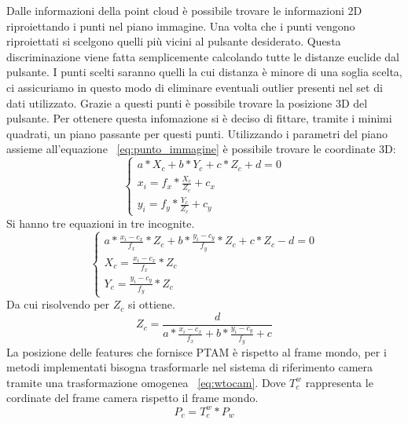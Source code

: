 Dalle informazioni della point cloud è possibile trovare le informazioni 2D riproiettando i punti nel piano immagine. Una volta che i punti vengono riproiettati si scelgono quelli più vicini al pulsante desiderato. Questa discriminazione viene fatta semplicemente calcolando tutte le distanze euclide dal pulsante. I punti scelti saranno quelli la cui distanza è minore di una soglia scelta, ci assicuriamo in questo modo di eliminare eventuali outlier presenti nel set di dati utilizzato. Grazie a questi punti è possibile trovare la posizione 3D del pulsante. Per ottenere questa infomazione si è deciso di fittare, tramite i minimi quadrati, un piano passante per questi punti. Utilizzando i parametri del piano assieme all'equazione ~\ref{eq:punto_immagine} è possibile trovare le coordinate 3D:
\begin{equation}
\begin{cases}
	a*X_c + b*Y_c + c*Z_c+ d = 0    \\
  	x_i = f_x * \frac{X_c}{Z_c}	+ c_x\\	
	y_i = f_y* \frac{Y_c}{Z_c} + c_y
 \end{cases}
 \label{sistema di equazione}
\end{equation}
Si hanno tre equazioni in tre incognite. 
\begin{equation}
\begin{cases}
	a*\frac{x_i - c_x}{f_x}*Z_c + b* \frac{y_i - c_y}{f_y}*Z_c + c*Z_c -d = 0   \\
  	X_c = \frac{x_i - c_x}{f_x} *Z_c\\	
	Y_c = \frac{y_i - c_y}{f_y} *Z_c
 \end{cases}
 \label{sistema di equazione}
\end{equation}
Da cui risolvendo per $Z_c$ si ottiene.
\begin{equation}
Z_c = \frac{d}{a*\frac{x_i - c_x}{f_x} + b* \frac{y_i - c_y}{f_y} +c }
\label{Profondita'}
\end{equation}
La posizione delle features che fornisce PTAM è rispetto al frame mondo, per i metodi implementati bisogna trasformarle nel sistema di riferimento camera tramite una trasformazione omogenea ~\ref{eq:wtocam}. Dove $T_c ^w$ rappresenta le cordinate del frame camera rispetto il frame mondo. 
\begin{equation}
P_c = T_c^w*P_w
\label{eq:wtocam}
\end{equation}